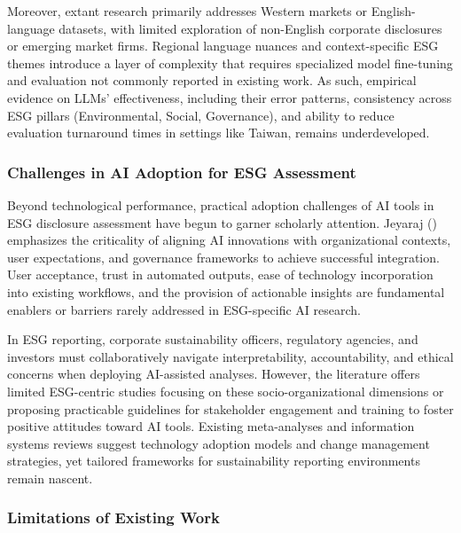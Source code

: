 \documentclass[
  12pt,
]{article}
\begin{document}
Moreover, extant research primarily addresses Western markets or
English-language datasets, with limited exploration of non-English
corporate disclosures or emerging market firms. Regional language
nuances and context-specific ESG themes introduce a layer of complexity
that requires specialized model fine-tuning and evaluation not commonly
reported in existing work. As such, empirical evidence on LLMs'
effectiveness, including their error patterns, consistency across ESG
pillars (Environmental, Social, Governance), and ability to reduce
evaluation turnaround times in settings like Taiwan, remains
underdeveloped.

\subsubsection{Challenges in AI Adoption for ESG
Assessment}\label{challenges-in-ai-adoption-for-esg-assessment}

Beyond technological performance, practical adoption challenges of AI
tools in ESG disclosure assessment have begun to garner scholarly
attention. Jeyaraj () emphasizes the
criticality of aligning AI innovations with organizational contexts,
user expectations, and governance frameworks to achieve successful
integration. User acceptance, trust in automated outputs, ease of
technology incorporation into existing workflows, and the provision of
actionable insights are fundamental enablers or barriers rarely
addressed in ESG-specific AI research.

In ESG reporting, corporate sustainability officers, regulatory
agencies, and investors must collaboratively navigate interpretability,
accountability, and ethical concerns when deploying AI-assisted
analyses. However, the literature offers limited ESG-centric studies
focusing on these socio-organizational dimensions or proposing
practicable guidelines for stakeholder engagement and training to foster
positive attitudes toward AI tools. Existing meta-analyses and
information systems reviews suggest technology adoption models and
change management strategies, yet tailored frameworks for sustainability
reporting environments remain nascent.

\subsubsection{Limitations of Existing
Work}\label{limitations-of-existing-work}
\end{document}
